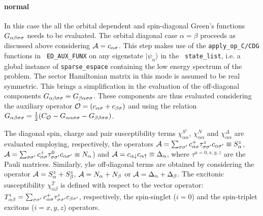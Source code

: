 \documentclass[final,3p,10pt]{elsarticle}
\newcommand{\ket}[1]
{|#1\rangle}
\def\a{\alpha}       \def\b{\beta}   \def\g{\gamma}   \def\d{\delta}
\def\AA{{\cal A}}
\def\up{\uparrow} \def\down{\downarrow} \def\dw{\downarrow}
\begin{document}
\paragraph{{\bf normal}}
In this case the all the orbital dependent and spin-diagonal Green's
functions $G_{\a\b\s\s}$ needs to be evaluated. The orbital diagonal case
$\a=\b$ proceeds as discussed above considering $\AA=c_{\a\s}$. This
step makes use of the {\tt apply\_op\_C/CDG} functions in {\tt
  ED\_AUX\_FUNX} on any eigenstate $\ket{\psi_n}$ in the {\tt
  state\_list}, i.e. a global instance of {\tt sparse\_espace}
containing the low energy spectrum of the problem.
The sector Hamiltonian matrix in this mode is assumed to be real
symmetric. This brings a simplification in the evaluation of the
off-diagonal components $G_{\a\b\s\s}=G_{\b\a\s\s}$.
These components are thus evaluated considering the auxiliary operator
$\OO=(c_{\a\s} + c_{\b\s})$ and using the relation
$G_{\a\b\s\s}=\tfrac{1}{2}(C_\OO - G_{\a\a\s\s} - G_{\b\b\s\s})$.

The diagonal spin, charge and pair susceptibility terms
$\chi^{S^z}_{\a\a}$, $\chi^N_{\a\a}$ and $\chi^\Delta_{\a\a}$ are
evaluated employing, respectively, the operators $\AA=\sum_{\s\s'}c^+_{\a\s}\tau^z_{\s\s'}c_{\a\s'}\equiv
S^z_\a$, $\AA=\sum_{\s\s'}c^+_{\a\s}\tau^0_{\s\s'}c_{\a\s'}\equiv
N_\a$) and $\AA=c_{\a\dw}c_{\a\up}\equiv
\Delta_\a$, where
$\tau^{a=0,x,y,z}$ are the Pauli matrices.
Similarly, yhe off-diagonal terms are obtained by considering the operator $\AA=S^z_\a
+ S^z_\b$, $\AA=N_\a + N_\b$ or $\AA=\Delta_\a + \Delta_\b$. 
The excitonic susceptibility $\chi^T_{\a\b}$ is defined with respect
to the vector operator: $T^i_{\a\b} = \sum_{\s\s'}
c^+_{\a\s}\tau^i_{\s\s'}c_{\b\s'}$, respectively, the spin-singlet
($i=0$) and the spin-triplet excitons ($i=x,y,z$) operators.
\end{document}
